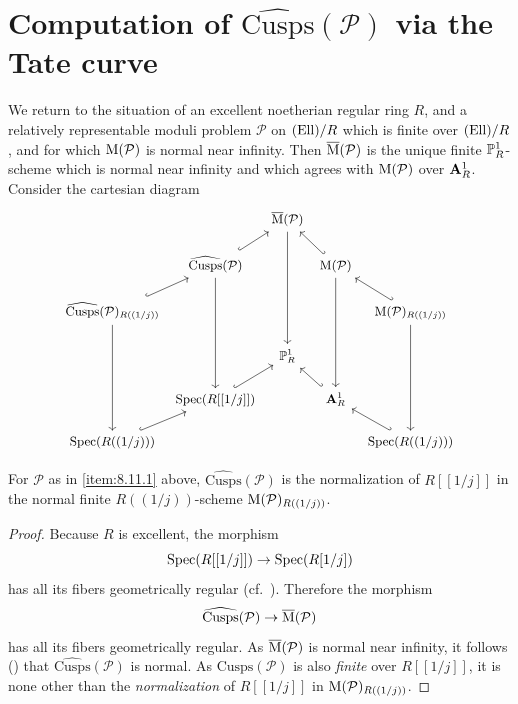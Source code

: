 \section{Computation of $\widehat{\mathrm{Cusps}}(\mathcal{P})$ via the Tate curve}
\label{sec:8.11}

\kmitem\label{item:8.11.1}
We return to the situation of an excellent noetherian regular ring $R$, and a relatively representable moduli problem $\mathcal{P}$ on $(\mathrm{Ell})/R$ which is finite over $(\mathrm{Ell})/R$, and for which $\mathrm{M}(\mathcal{P})$ is normal near infinity. Then $\overline{\mathrm{M}}(\mathcal{P})$ is the unique finite $\mathbb{P}^1_R$-scheme which is normal near infinity and which agrees with $\mathrm{M}(\mathcal{P})$ over $\mathbf{A}^1_R$. Consider the cartesian diagram
\begin{equation}\label{eq:8.11.1.1}
\begin{tikzcd}[row sep=1.4em, column sep=0.3em, font=\small]
& & \overline{\Mcoarse}(\mathcal{P}) \arrow[ddd] & & \\
& \widehat{\mathrm{Cusps}}(\mathcal{P}) \arrow[ru, hook] \arrow[ddd] & & \Mcoarse(\mathcal{P}) \arrow[lu, hook'] \arrow[ddd] & \\
\widehat{\mathrm{Cusps}}(\mathcal{P})_{R((1/j))} \arrow[ru, hook] \arrow[ddd] & & & & \Mcoarse(\mathcal{P})_{R((1/j))} \arrow[lu, hook'] \arrow[ddd] \\
& & \PP^1_R & & \\
& \Spec(R[[1/j]]) \arrow[ru, hook] & & \Aff^1_R \arrow[lu, hook'] & \\
\Spec(R((1/j))) \arrow[ru, hook] & & & & \Spec(R((1/j))) \arrow[lu, hook']
\end{tikzcd}
\end{equation}

\begin{klem}\label{lem:8.11.2}
For $\mathcal{P}$ as in \eqref{item:8.11.1} above, $\widehat{\mathrm{Cusps}}(\mathcal{P})$ is the normalization of $R[[1/j]]$ in the normal finite $R((1/j))$-scheme $\mathrm{M}(\mathcal{P})_{R((1/j))}$.
\end{klem}

\begin{proof}
Because $R$ is excellent, the morphism
\[
\operatorname{Spec}(R[[1/j]]) \to \operatorname{Spec}(R[1/j])
\]
has all its fibers geometrically regular (cf.~\cite[IV, 7.8.3]{EGA}). Therefore the morphism
\[
\widehat{\mathrm{Cusps}}(\mathcal{P}) \to \overline{\mathrm{M}}(\mathcal{P})
\]
has all its fibers geometrically regular. As $\overline{\mathrm{M}}(\mathcal{P})$ is normal near infinity, it follows (\cite[VII, 4.8]{AK1}) that $\widehat{\mathrm{Cusps}}(\mathcal{P})$ is normal. As $\widehat{\mathrm{Cusps}}(\mathcal{P})$ is also \emph{finite} over $R[[1/j]]$, it is none other than the \emph{normalization} of $R[[1/j]]$ in $\mathrm{M}(\mathcal{P})_{R((1/j))}$.
\end{proof}

